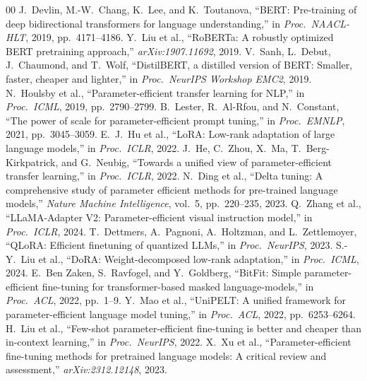 \documentclass[conference]{IEEEtran}
\begin{document}
\begin{thebibliography}{00}
 J.\ Devlin, M.-W.\ Chang, K.\ Lee, and K.\ Toutanova, ``BERT: Pre-training of deep bidirectional transformers for language understanding,'' in \textit{Proc.\ NAACL-HLT}, 2019, pp.\ 4171--4186.
 Y.\ Liu et al., ``RoBERTa: A robustly optimized BERT pretraining approach,'' \textit{arXiv:1907.11692}, 2019.
 V.\ Sanh, L.\ Debut, J.\ Chaumond, and T.\ Wolf, ``DistilBERT, a distilled version of BERT: Smaller, faster, cheaper and lighter,'' in \textit{Proc.\ NeurIPS Workshop EMC2}, 2019.
 N.\ Houlsby et al., ``Parameter-efficient transfer learning for NLP,'' in \textit{Proc.\ ICML}, 2019, pp.\ 2790--2799.
 B.\ Lester, R.\ Al-Rfou, and N.\ Constant, ``The power of scale for parameter-efficient prompt tuning,'' in \textit{Proc.\ EMNLP}, 2021, pp.\ 3045--3059.
 E.\ J.\ Hu et al., ``LoRA: Low-rank adaptation of large language models,'' in \textit{Proc.\ ICLR}, 2022.
 J.\ He, C.\ Zhou, X.\ Ma, T.\ Berg-Kirkpatrick, and G.\ Neubig, ``Towards a unified view of parameter-efficient transfer learning,'' in \textit{Proc.\ ICLR}, 2022.
 N.\ Ding et al., ``Delta tuning: A comprehensive study of parameter efficient methods for pre-trained language models,'' \textit{Nature Machine Intelligence}, vol.\ 5, pp.\ 220--235, 2023.
 Q.\ Zhang et al., ``LLaMA-Adapter V2: Parameter-efficient visual instruction model,'' in \textit{Proc.\ ICLR}, 2024.
 T.\ Dettmers, A.\ Pagnoni, A.\ Holtzman, and L.\ Zettlemoyer, ``QLoRA: Efficient finetuning of quantized LLMs,'' in \textit{Proc.\ NeurIPS}, 2023.
 S.-Y.\ Liu et al., ``DoRA: Weight-decomposed low-rank adaptation,'' in \textit{Proc.\ ICML}, 2024.
 E.\ Ben Zaken, S.\ Ravfogel, and Y.\ Goldberg, ``BitFit: Simple parameter-efficient fine-tuning for transformer-based masked language-models,'' in \textit{Proc.\ ACL}, 2022, pp.\ 1--9.
 Y.\ Mao et al., ``UniPELT: A unified framework for parameter-efficient language model tuning,'' in \textit{Proc.\ ACL}, 2022, pp.\ 6253--6264.
 H.\ Liu et al., ``Few-shot parameter-efficient fine-tuning is better and cheaper than in-context learning,'' in \textit{Proc.\ NeurIPS}, 2022.
 X.\ Xu et al., ``Parameter-efficient fine-tuning methods for pretrained language models: A critical review and assessment,'' \textit{arXiv:2312.12148}, 2023.

\end{thebibliography}
\end{document}
